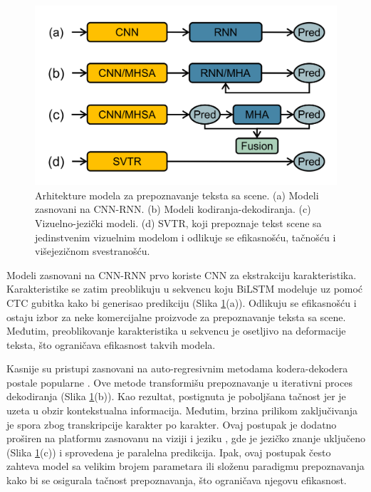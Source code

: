 \documentclass[a4paper,12pt]{article}
\begin{document}
	\begin{figure}[H]
		\centering
		\includegraphics[width=\textwidth]{assets/text-recognition-model-architectures.png}
		\caption{Arhitekture modela za prepoznavanje teksta sa scene. (a) Modeli zasnovani na CNN-RNN. (b) Modeli kodiranja-dekodiranja. (c) Vizuelno-jezički modeli. (d) SVTR, koji prepoznaje tekst scene sa jedinstvenim vizuelnim modelom i odlikuje se efikasnošću, tačnošću i višejezičnom svestranošću.}
		\label{fig:tr-model-architectures}
	\end{figure}
	
	Modeli zasnovani na CNN-RNN \cite{shi2015endtoend} prvo koriste CNN za ekstrakciju karakteristika. Karakteristike se zatim preoblikuju u sekvencu koju BiLSTM modeluje uz pomoć CTC gubitka kako bi generisao predikciju (Slika \ref{fig:tr-model-architectures}(a)). Odlikuju se efikasnošću i ostaju izbor za neke komercijalne proizvode za prepoznavanje teksta sa scene. Međutim, preoblikovanje karakteristika u sekvencu je osetljivo na deformacije teksta, što ograničava efikasnost takvih modela.
	
	Kasnije su pristupi zasnovani na auto-regresivnim metodama kodera-dekodera postale popularne \cite{sheng2019nrtr, li2019show, zheng2023cdistnet}. Ove metode transformišu prepoznavanje u iterativni proces dekodiranja (Slika \ref{fig:tr-model-architectures}(b)). Kao rezultat, postignuta je poboljšana tačnost jer je uzeta u obzir kontekstualna informacija. Međutim, brzina prilikom zaključivanja je spora zbog transkripcije karakter po karakter. Ovaj postupak je dodatno proširen na platformu zasnovanu na viziji i jeziku \cite{yu2020accuratescenetextrecognition, fang2021readlikehumansautonomous}, gde je jezičko znanje uključeno (Slika \ref{fig:tr-model-architectures}(c)) i sprovedena je paralelna predikcija. Ipak, ovaj postupak često zahteva model sa velikim brojem parametara ili složenu paradigmu prepoznavanja kako bi se osigurala tačnost prepoznavanja, što ograničava njegovu efikasnost.
	
\end{document}
